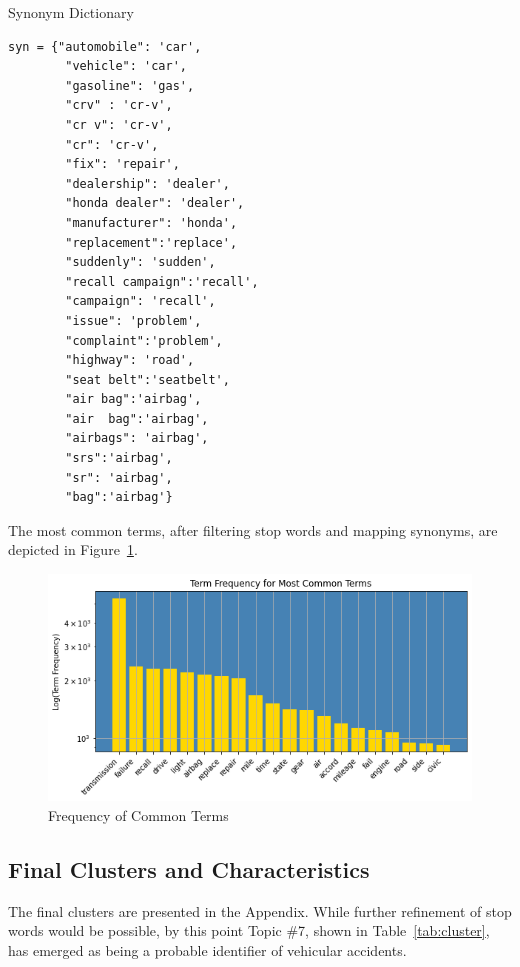 \documentclass[12pt]{article}
\begin{document}
\begin{table}
\caption{Synonym Dictionary}
\label{tab:synDict}
{\footnotesize
\begin{lstlisting}
syn = {"automobile": 'car', 
        "vehicle": 'car', 
        "gasoline": 'gas', 
        "crv" : 'cr-v',
        "cr v": 'cr-v',
        "cr": 'cr-v',
        "fix": 'repair',
        "dealership": 'dealer',
        "honda dealer": 'dealer',
        "manufacturer": 'honda', 
        "replacement":'replace',
        "suddenly": 'sudden',
        "recall campaign":'recall',
        "campaign": 'recall',
        "issue": 'problem',
        "complaint":'problem',
        "highway": 'road', 
        "seat belt":'seatbelt',
        "air bag":'airbag',
        "air  bag":'airbag',
        "airbags": 'airbag',
        "srs":'airbag',
        "sr": 'airbag',
        "bag":'airbag'}
\end{lstlisting}
}
\end{table}

The most common terms, after filtering stop words and mapping synonyms, are depicted in Figure~\ref{fig:termFreq}.
\begin{figure}
	\begin{center}
	\includegraphics[width=\textwidth, keepaspectratio, angle=0]{termFreq.png}
	\caption{Frequency of Common Terms}
	\label{fig:termFreq}
	\end{center}
\end{figure}

\subsection{Final Clusters and Characteristics}
The final clusters are presented in the Appendix. While further refinement of stop words would be possible, by this point Topic \#7, shown in Table~\ref{tab:cluster}, has emerged as being a probable identifier of vehicular accidents.
\end{document}
